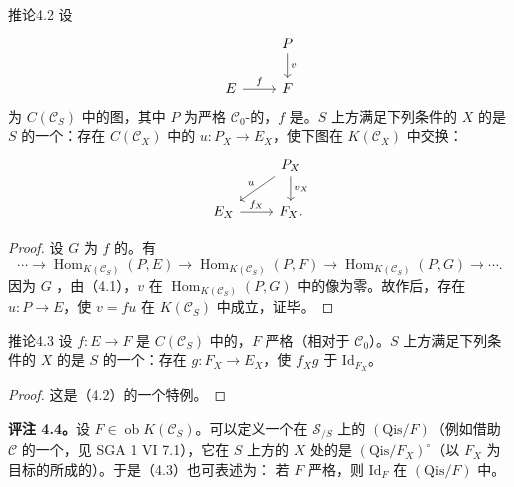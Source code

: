 \begin{SGAresult}{推论}{4.2}
设
\[\begin{tikzcd}&P\arrow[d,"v"]\\E\arrow[r,"f"]&F\end{tikzcd}\]
为 $C(\mathcal C_S)$ 中的图，其中 $P$ 为严格 $\mathcal C_0$-的，$f$ 是。$S$ 上方满足下列条件的 $X$ 的是 $S$ 的一个：存在 $C(\mathcal C_X)$ 中的 $u:P_X\to E_X$，使下图在 $K(\mathcal C_X)$ 中交换：
\[\begin{tikzcd}&P_X\arrow[dl,"u"']\arrow[d,"v_X"]\\E_X\arrow[r,"f_X"]&F_X.\end{tikzcd}\]
\end{SGAresult}
\begin{proof}
设 $G$ 为 $f$ 的。有
\[\cdots\longrightarrow\operatorname{Hom}_{K(\mathcal C_S)}(P,E)
\longrightarrow\operatorname{Hom}_{K(\mathcal C_S)}(P,F)
\longrightarrow\operatorname{Hom}_{K(\mathcal C_S)}(P,G)\longrightarrow\cdots.\]
因为 $G$ ，由（4.1），$v$ 在 $\operatorname{Hom}_{K(\mathcal C_S)}(P,G)$ 中的像为零。故作后，存在 $u:P\to E$，使 $v=fu$ 在 $K(\mathcal C_S)$ 中成立，证毕。
\end{proof}

\begin{SGAresult}{推论}{4.3}
设 $f:E\to F$ 是 $C(\mathcal C_S)$ 中的，$F$ 严格（相对于 $\mathcal C_0$）。$S$ 上方满足下列条件的 $X$ 的是 $S$ 的一个：存在 $g:F_X\to E_X$，使 $f_Xg$ 于 $\mathrm{Id}_{F_X}$。
\end{SGAresult}
\begin{proof}这是（4.2）的一个特例。\end{proof}

\textbf{评注 4.4。}设 $F\in\operatorname{ob}K(\mathcal C_S)$。可以定义一个在 $\mathscr S_{/S}$ 上的 $(\mathrm{Qis}/F)$（例如借助 $\mathcal C$ 的一个，见 SGA 1 VI 7.1），它在 $S$ 上方的 $X$ 处的是 $(\mathrm{Qis}/F_X)^\circ$（以 $F_X$ 为目标的所成的）。于是（4.3）也可表述为：
若 $F$ 严格，则 $\mathrm{Id}_F$ 在 $(\mathrm{Qis}/F)$ 中。

